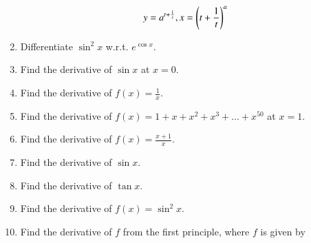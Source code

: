 \begin{enumerate}[label=\arabic*.,ref=\thesubsection.\theenumi]
\begin{align}
y = a^{t + \frac{1}{t}}, x = \left(t + \frac{1}{t}\right)^a
\end{align}
%
\item Differentiate $\sin ^2 x$ w.r.t. $e^{\cos x}$.
%
\item Find the derivative of $\sin x $ at $x = 0$.
\item Find the derivative of $f(x) = \frac{1}{x}$.
\item Find the derivative of $f(x) = 1 + x + x^2 + x^3 + \dots + x^50$ at $x = 1$.
\item Find the derivative of $f(x) = \frac{x+1}{x}$.
\item Find the derivative of $\sin x $.
\item Find the derivative of $\tan x $.
\item Find the derivative of $f(x) = \sin^2 x $.
%
\item Find the derivative of $f$ from the first principle, where $f$ is given by 
%
\begin{enumerate}

\end{enumerate}
\end{enumerate}

